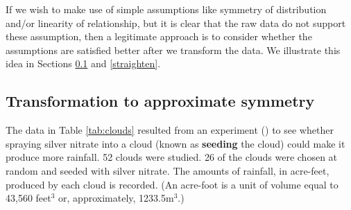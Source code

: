 \documentclass[
  british,
  11pt,
  openany, a4paper]{book}
\begin{document}
If we wish to make use of simple assumptions like symmetry of distribution and/or linearity of relationship, but it is clear that the raw data do not support these assumption, then a legitimate approach is to consider whether the assumptions are satisfied better after we transform the data. We illustrate this idea in Sections \ref{transsymmetry} and \ref{straighten}.

\subsection{Transformation to approximate symmetry}\label{transsymmetry}

The data in Table \ref{tab:clouds} resulted from an experiment (\citet{clouds}) to see whether spraying silver nitrate into a cloud (known as \textbf{seeding} the cloud)
could make it produce more rainfall. 52 clouds were studied. 26 of the clouds were chosen at random and seeded with silver nitrate. The amounts of rainfall, in acre-feet, produced by each cloud is recorded. (An acre-foot is a unit of volume equal to 43,560 feet\(^3\) or, approximately, 1233.5m\(^3\).)

 
  \providecommand{\huxb}[2]{\arrayrulecolor[RGB]{#1}\global\arrayrulewidth=#2pt}
  \providecommand{\huxvb}[2]{\color[RGB]{#1}\vrule width #2pt}
  \providecommand{\huxtpad}[1]{\rule{0pt}{#1}}
  \providecommand{\huxbpad}[1]{\rule[-#1]{0pt}{#1}}
\end{document}
